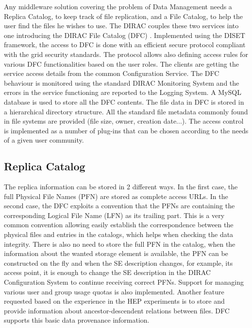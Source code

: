 Any middleware solution covering the problem of Data Management needs a Replica Catalog, to keep track of 
file replication, and a File Catalog, to help the user find the files he wishes to use. The DIRAC 
couples these two services into one introducing the DIRAC File Catalog (DFC) \cite{DFC}. Implemented using the DISET 
framework, the access to DFC is done with an efficient secure protocol compliant with the grid security standards.
The protocol allows also defining access rules for various DFC functionalities based on the user roles. The
clients are getting the service access details from the common Configuration Service. The DFC behaviour
is monitored using the standard DIRAC Monitoring System and the errors in the service functioning are
reported to the Logging System. A MySQL database is used to store all the DFC contents. %
The file data in DFC is stored in a hierarchical directory structure. All the standard file metadata 
commonly found in file systems are provided (file size, owner, creation date...). The access control 
is implemented as a number of plug-ins that can be chosen according to the needs of a given user community.


\subsection{Replica Catalog}

The replica information can be stored in 2 different ways. In the first case, the full Physical File
Names (PFN) are stored as complete access URLs. In the second case, the DFC exploits a convention
that the PFNs are containing the corresponding Logical File Name (LFN) as its trailing part. This is a very common
convention allowing easily establish the correspondence between the physical files and entries in the catalogs, 
which helps when checking the data integrity. There is also no need to store the full PFN in the catalog, when
the information about the wanted storage element is available, the PFN can be constructed on the fly and when 
the SE description changes, for example, its access point, it is enough to change the SE description in the DIRAC 
Configuration System to continue receiving correct PFNs. Support for managing various user and group usage 
quotas is also implemented. Another feature requested based on the experience in 
the HEP experiments is to store and provide information about ancestor-descendent relations between files. 
DFC supports this basic data provenance information. 


